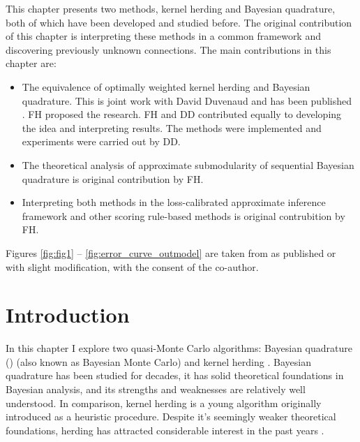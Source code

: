 
\begin{summarycontributions}
\cbstart
This chapter presents two methods, kernel herding and Bayesian quadrature, both of which have been developed and studied before. The original contribution of this chapter is interpreting these methods in a common framework and discovering previously unknown connections.
The main contributions in this chapter are:
\begin{itemize}[noitemsep,topsep=0pt,parsep=0pt,partopsep=0pt]
	\item The equivalence of optimally weighted kernel herding and Bayesian quadrature. This is joint work with David Duvenaud and has been published \citep{Huszar2012herding}. FH proposed the research. FH and DD contributed equally to developing the idea and interpreting results. The methods were implemented and experiments were carried out by DD.
	\item The theoretical analysis of approximate submodularity of sequential Bayesian quadrature is original contribution by FH.
	\item Interpreting both methods in the loss-calibrated approximate inference framework and other scoring rule-based methods is original contrubition by FH.
\end{itemize}
 Figures \ref{fig:fig1} -- \ref{fig:error_curve_outmodel} are taken from \citep{Huszar2012herding} as published or with slight modification, with the consent of the co-author.
 \cbend
\end{summarycontributions}


\section{Introduction}

\cbstart
In this chapter I explore two quasi-Monte Carlo algorithms: Bayesian quadrature (\bq{}) \citep{BZHermiteQuadrature,BZMonteCarlo} (also known as Bayesian Monte Carlo) and kernel herding \citep{Chen2010}. Bayesian quadrature has been studied for decades, it has solid theoretical foundations in Bayesian analysis, and its strengths and weaknesses are relatively well understood. In comparison, kernel herding is a young algorithm originally introduced as a heuristic procedure. Despite it's seemingly weaker theoretical foundations, herding has attracted considerable interest in the past years \citep{welling2009herding,Gelfand2010,Chen2010,Huszar2012herding,Bach2012}.

